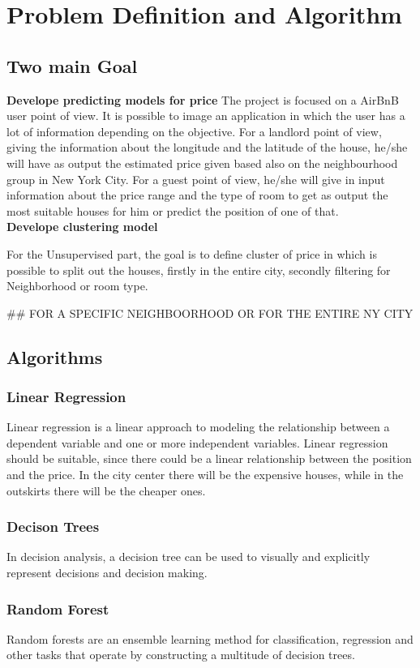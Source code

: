 \documentclass{FR16}
\begin{document}
\newpage
\section{Problem Definition and Algorithm}
\subsection{Two main Goal}
\textbf{Develope predicting models for price}
The project is focused on a AirBnB user point of view. It is possible to image an application in which the user has a lot of information depending on the objective. For a landlord point of view, giving the information about the longitude and the latitude of the house, he/she will have as output the estimated price given based also on the neighbourhood group in New York City. For a guest point of view, he/she will give in input information about the price range and the type of room to get as output the most suitable houses for him or predict the position of one of that.\\

\textbf{Develope clustering model}

For the Unsupervised part, the goal is to define cluster of price in which is possible to split out the houses, firstly in the entire city, secondly filtering for Neighborhood or room type. 

## FOR A SPECIFIC NEIGHBOORHOOD OR FOR THE ENTIRE NY CITY
\subsection{Algorithms}
\subsubsection{Linear Regression}
 Linear regression  is a linear approach to modeling the relationship between a dependent variable and one or more independent variables. Linear regression should be suitable, since there could be a linear relationship between the position and the price. In the city center there will be the expensive houses, while in the outskirts there will be the cheaper ones.
  \subsubsection{Decison Trees}
In decision analysis, a decision tree can be used to visually and explicitly represent decisions and decision making.

 \subsubsection{Random Forest}
 Random forests are an ensemble learning method for classification, regression and other tasks that operate by constructing a multitude of decision trees.
\end{document}
